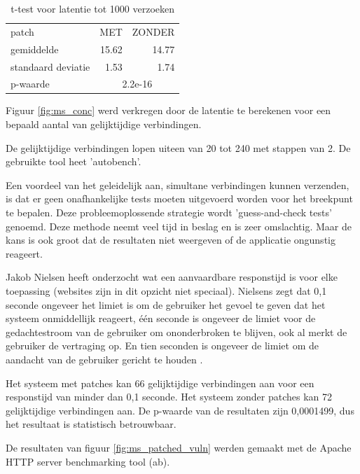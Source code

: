 \begin{table}[]
	\centering
	\caption{t-test voor latentie tot 1000 verzoeken}
	\label{t_ms_patched_vuln}
	\begin{tabular}{l|cr}
		\hline
		patch              & MET                       & \multicolumn{1}{c}{ZONDER} \\
		gemiddelde         & \multicolumn{1}{r}{15.62} & 14.77                      \\
		standaard deviatie & \multicolumn{1}{r}{1.53}  & 1.74                       \\ \hline
		p-waarde           & \multicolumn{2}{c|}{2.2e-16}                          
	\end{tabular}
\end{table}


Figuur \ref{fig:ms_conc} werd verkregen door de latentie te berekenen voor een bepaald aantal van gelijktijdige verbindingen.

De gelijktijdige verbindingen lopen uiteen van 20 tot 240 met stappen van 2. 
De gebruikte tool heet 'autobench'.

Een voordeel van het geleidelijk aan, simultane verbindingen kunnen verzenden, is dat er geen onafhankelijke tests moeten uitgevoerd worden voor het breekpunt te bepalen.
Deze probleemoplossende strategie wordt 'guess-and-check tests' genoemd.
Deze methode neemt veel tijd in beslag en is zeer omslachtig.
Maar de kans is ook groot dat de resultaten niet weergeven of de applicatie ongunstig reageert.

Jakob Nielsen heeft onderzocht wat een aanvaardbare responstijd is voor elke toepassing (websites zijn in dit opzicht niet speciaal).
Nielsens zegt dat 0,1 seconde ongeveer het limiet is om de gebruiker het gevoel te geven dat het systeem onmiddellijk reageert, één seconde is ongeveer de limiet voor de gedachtestroom van de gebruiker om ononderbroken te blijven, ook al merkt de gebruiker de vertraging op.
En tien seconden is ongeveer de limiet om de aandacht van de gebruiker gericht te houden \parencite{Nielsen1993}.

Het systeem met patches kan 66 gelijktijdige verbindingen aan voor een responstijd van minder dan 0,1 seconde.
Het systeem zonder patches kan 72 gelijktijdige verbindingen aan.
De p-waarde van de resultaten zijn 0,0001499, dus het resultaat is statistisch betrouwbaar.


De resultaten van figuur \ref{fig:ms_patched_vuln} werden gemaakt met de Apache HTTP server benchmarking tool (ab).

